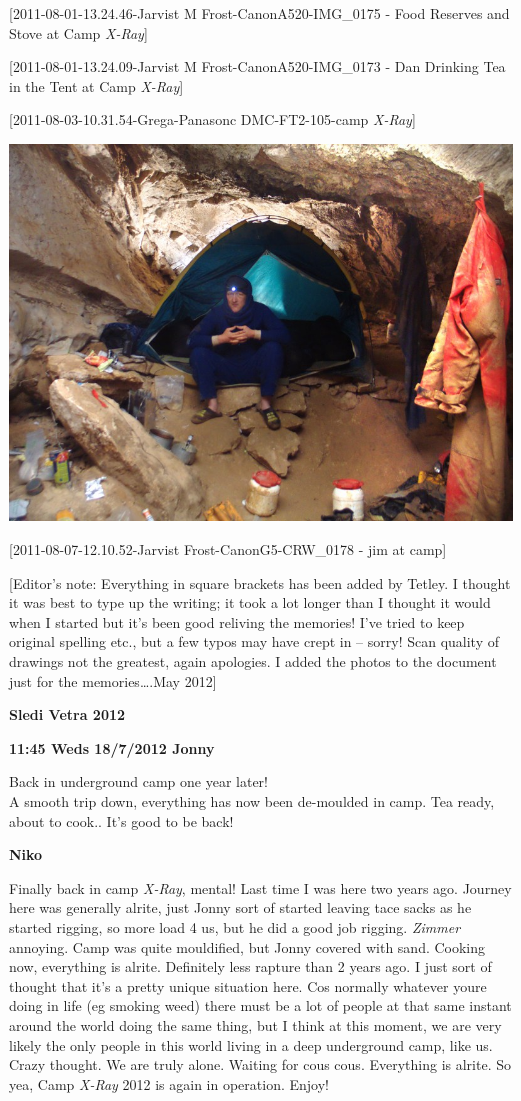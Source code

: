 {[}2011-08-01-13.24.46-Jarvist M Frost-CanonA520-IMG\_0175 - Food
Reserves and Stove at Camp \emph{X-Ray}{]}

{[}2011-08-01-13.24.09-Jarvist M Frost-CanonA520-IMG\_0173 - Dan
Drinking Tea in the Tent at Camp \emph{X-Ray}{]}

{[}2011-08-03-10.31.54-Grega-Panasonc DMC-FT2-105-camp \emph{X-Ray}{]}

\includegraphics{UgLog1012/62.png}

{[}2011-08-07-12.10.52-Jarvist Frost-CanonG5-CRW\_0178 - jim at camp{]}

{[}Editor's note: Everything in square brackets has been added by
Tetley. I thought it was best to type up the writing; it took a lot
longer than I thought it would when I started but it's been good
reliving the memories! I've tried to keep original spelling etc., but a
few typos may have crept in -- sorry! Scan quality of drawings not the
greatest, again apologies. I added the photos to the document just for
the memories\ldots{}.May 2012{]}

\textbf{Sledi Vetra 2012}

\textbf{11:45 Weds 18/7/2012 Jonny}

Back in underground camp one year later!\\
A smooth trip down, everything has now been de-moulded in camp. Tea
ready, about to cook.. It's good to be back!

\textbf{Niko}

Finally back in camp \emph{X-Ray}, mental! Last time I was here two
years ago. Journey here was generally alrite, just Jonny sort of started
leaving tace sacks as he started rigging, so more load 4 us, but he did
a good job rigging. \emph{Zimmer} annoying. Camp was quite mouldified,
but Jonny covered with sand. Cooking now, everything is alrite.
Definitely less rapture than 2 years ago. I just sort of thought that
it's a pretty unique situation here. Cos normally whatever youre doing
in life (eg smoking weed) there must be a lot of people at that same
instant around the world doing the same thing, but I think at this
moment, we are very likely the only people in this world living in a
deep underground camp, like us. Crazy thought. We are truly alone.
Waiting for cous cous. Everything is alrite. So yea, Camp \emph{X-Ray}
2012 is again in operation. Enjoy!

